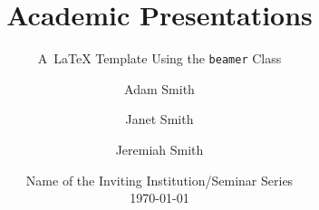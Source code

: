 

\newcommand{\balA}[1][1]{BAL$^\mathup{I}_{#1:#1}$\xspace}
\newcommand{\unbalA}[1][n]{UNBAL$^\mathup{I}_{1:#1}$\xspace}
\newcommand{\balB}[1][1]{BAL$^\mathup{II}_{#1:#1}$\xspace}
\newcommand{\unbalB}[1][n]{UNBAL$^\mathup{II}_{#1:1}$\xspace}


\title[Academic Presentations]{%
	\textbf{%
		Academic Presentations%
	}%
}

\subtitle{A~LaTeX Template Using the \texttt{beamer} Class}


\author[Smith, Smith, and Smith]{%
	Adam Smith \and
	\alert{Janet Smith} \and
	Jeremiah Smith
} %


\date{%
	Name of the Inviting Institution/Seminar Series \\[\medskipamount]
	\textmd{\today}%
}






\begin{frame}[standout]{~}

	\titlepage%

\end{frame}


